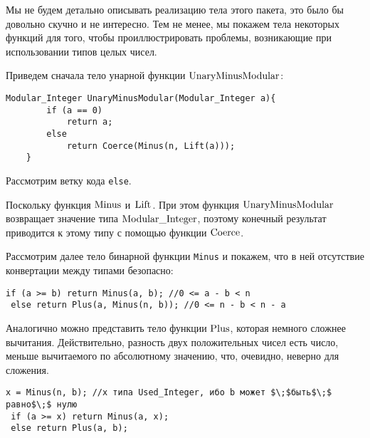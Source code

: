 \documentclass{../../template/mai_book}
\begin{document}
    Мы не будем детально описывать реализацию тела этого пакета, это было бы довольно скучно и не интересно. Тем не менее, мы покажем
    тела некоторых функций для того, чтобы проиллюстрировать проблемы, возникающие при использовании типов целых чисел.

    Приведем сначала тело унарной функции $\lstinline{UnaryMinusModular}$:
    \begin{lstlisting}[mathescape=true, frame=none]
    Modular_Integer UnaryMinusModular(Modular_Integer a){
    	if (a == 0)
    		return a;
    	else
    		return Coerce(Minus(n, Lift(a)));
    }
    \end{lstlisting}

    Рассмотрим ветку кода \lstinline{else}.

    Поскольку функция $\lstinline{Minus}$ и $\lstinline{Lift}$. При этом функция
    $\lstinline{UnaryMinusModular}$ возвращает значение типа $\lstinline{Modular_Integer}$, поэтому конечный результат приводится к этому типу с помощью функции $\lstinline{Coerce}$.

    Рассмотрим далее тело бинарной функции \lstinline{Minus} и покажем, что в ней отсутствие конвертации между типами безопасно:
    \begin{leftbar}
    \begin{lstlisting}[mathescape=true, frame=none]
 if (a >= b) return Minus(a, b); //0 <= a - b < n
 else return Plus(a, Minus(n, b)); //0 <= n - b < n - a
    \end{lstlisting}
    \end{leftbar}

    Аналогично можно представить тело функции $\lstinline{Plus}$, которая немного сложнее вычитания. Действительно, разность двух положительных чисел есть число, меньше вычитаемого по абсолютному значению, что, очевидно, неверно для сложения.
    \begin{leftbar}
    \begin{lstlisting}[mathescape=true, frame=none]
 x = Minus(n, b); //x типа Used_Integer, ибо b может $\;$быть$\;$ равно$\;$ нулю
 if (a >= x) return Minus(a, x);
 else return Plus(a, b);
    \end{lstlisting}
    \end{leftbar}
\end{document}
